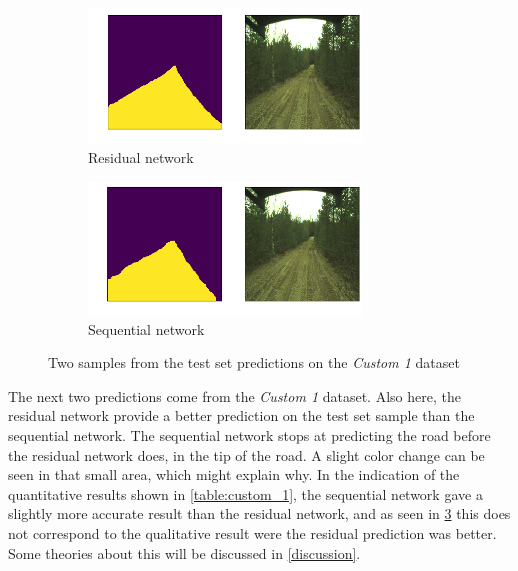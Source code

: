 \documentclass[USenglish]{ifimaster}  %
\begin{document}
\begin{figure}[ht]
\centering
\begin{subfigure}[b]{\textwidth}
\centering
\includegraphics[width=0.8\textwidth]{bilder/custom_1/185_residual.png}
\caption{Residual network}
\label{fig:custom_1_res}
\end{subfigure}
\hfill
\begin{subfigure}[b]{\textwidth}
\centering
\includegraphics[width=0.8\textwidth]{bilder/custom_1/185_sequential.png}
\caption{Sequential network}
\label{fig:custom_1_seq}
\end{subfigure}
\caption{Two samples from the test set predictions on the
\textit{Custom 1} dataset}
\label{fig:custom_1_result}
\end{figure}

The next two predictions come from the \textit{Custom 1} dataset. Also here, the residual network provide a better prediction on the test set sample than the sequential network. The sequential network stops at predicting the road before the residual network does, in the tip of the road. A slight color change can be seen in that small area, which might explain why. In the indication of the quantitative results shown in \cref{table:custom_1}, the sequential network gave a slightly more accurate result than the residual network, and as seen in \cref{fig:custom_1_result} this does not correspond to the qualitative result were the residual prediction was better. Some theories about this will be discussed in \cref{discussion}. 
\end{document}
